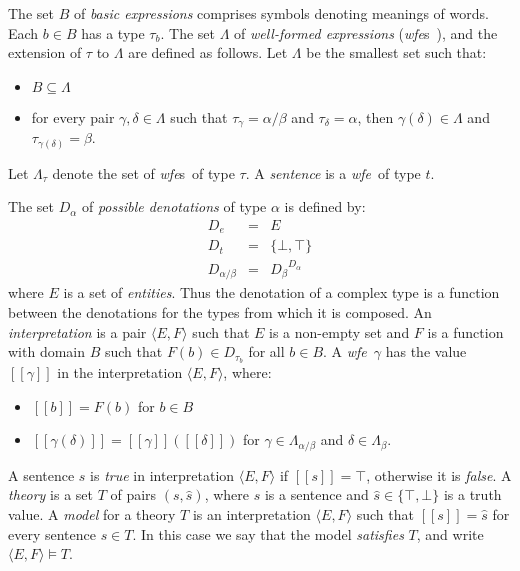 \documentclass[a4paper,11pt]{article}
\theoremstyle{definition}
\newcommand{\interp}[1]{[\![ #1 ]\!]}
\newcommand{\wfe}{\mbox{{\em wfe} }}
\newcommand{\wfes}{\mbox{{\em wfe}s }}
\begin{document}
The set $B$ of \emph{basic expressions} comprises
symbols denoting meanings of words. Each $b\in B$ has a type $\tau_b$. The set $\Lambda$ of
\emph{well-formed expressions} (\wfes\!\!), and the extension of $\tau$ to $\Lambda$ are
defined as follows. Let $\Lambda$ be the smallest set such that:

\begin{itemize}
\item $B\subseteq \Lambda$
\item for every pair $\gamma,\delta\in \Lambda$ such that $\tau_\gamma
  = \alpha/\beta$ and $\tau_\delta = \alpha$, then $\gamma(\delta)\in
  \Lambda$ and $\tau_{\gamma(\delta)} = \beta$.
\end{itemize}
Let $\Lambda_\tau$ denote the set of \wfes of type
$\tau$. A \emph{sentence} is a \wfe of type $t$.


The set $D_\alpha$ of \emph{possible denotations} of type $\alpha$ is
defined by:
\begin{eqnarray*}
D_e &=& E\\
D_t &=& \{\bot,\top\}\\
D_{\alpha/\beta} &=& {D_\beta}^{D_\alpha}
\end{eqnarray*}
where $E$ is a set of \emph{entities}. Thus the denotation of a
complex type is a function between the denotations for the types from
which it is composed. An \emph{interpretation} is a pair $\langle E,
F\rangle$ such that $E$ is a non-empty set and $F$ is a function with
domain $B$ such that $F(b) \in D_{\tau_b}$ for all $b\in B$. A \wfe $\gamma$ has the value $\interp{\gamma}$ in the
interpretation $\langle E, F\rangle$, where:
\begin{itemize}
\item $\interp{b} = F(b)$ for $b\in B$
\item $\interp{\gamma(\delta)} = \interp{\gamma}(\interp{\delta})$ for $\gamma
  \in \Lambda_{\alpha/\beta}$ and $\delta \in \Lambda_\beta$.
\end{itemize}
A sentence $s$ is \emph{true} in interpretation $\langle E, F\rangle$
if $\interp{s} = \top$, otherwise it is \emph{false}. A \emph{theory} is a set $T$ of pairs $(s,\hat{s})$, where $s$ is a
sentence and $\hat{s}\in\{\top,\bot\}$ is a truth value. A
\emph{model} for a theory $T$ is an interpretation $\langle E,
F\rangle$ such that $\interp{s} = \hat{s}$ for every sentence $s\in
T$. In this case we say that the model \emph{satisfies} $T$, and write
$\langle E, F\rangle \models T$.
\end{document}
